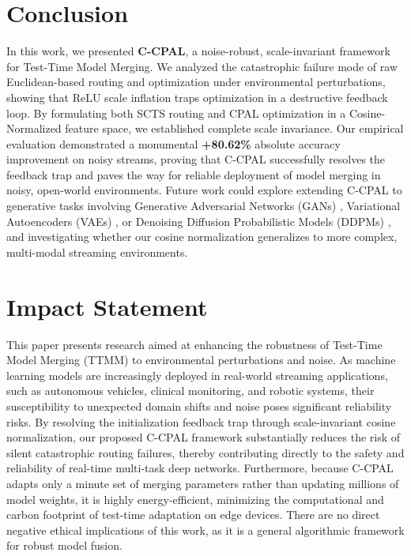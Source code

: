 \documentclass{article}
\theoremstyle{plain}
\theoremstyle{definition}
\theoremstyle{remark}
\begin{document}
\section{Conclusion}
In this work, we presented \textbf{C-CPAL}, a noise-robust, scale-invariant framework for Test-Time Model Merging. We analyzed the catastrophic failure mode of raw Euclidean-based routing and optimization under environmental perturbations, showing that ReLU scale inflation traps optimization in a destructive feedback loop. By formulating both SCTS routing and CPAL optimization in a Cosine-Normalized feature space, we established complete scale invariance. Our empirical evaluation demonstrated a monumental \textbf{+80.62\%} absolute accuracy improvement on noisy streams, proving that C-CPAL successfully resolves the feedback trap and paves the way for reliable deployment of model merging in noisy, open-world environments. Future work could explore extending C-CPAL to generative tasks involving Generative Adversarial Networks (GANs) \cite{goodfellow14gan}, Variational Autoencoders (VAEs) \cite{kingma13vae}, or Denoising Diffusion Probabilistic Models (DDPMs) \cite{ho20ddpm,song20score,rombach22ldm}, and investigating whether our cosine normalization generalizes to more complex, multi-modal streaming environments.

\section*{Impact Statement}
This paper presents research aimed at enhancing the robustness of Test-Time Model Merging (TTMM) to environmental perturbations and noise. As machine learning models are increasingly deployed in real-world streaming applications, such as autonomous vehicles, clinical monitoring, and robotic systems, their susceptibility to unexpected domain shifts and noise poses significant reliability risks. By resolving the initialization feedback trap through scale-invariant cosine normalization, our proposed C-CPAL framework substantially reduces the risk of silent catastrophic routing failures, thereby contributing directly to the safety and reliability of real-time multi-task deep networks. Furthermore, because C-CPAL adapts only a minute set of merging parameters rather than updating millions of model weights, it is highly energy-efficient, minimizing the computational and carbon footprint of test-time adaptation on edge devices. There are no direct negative ethical implications of this work, as it is a general algorithmic framework for robust model fusion.
\end{document}

